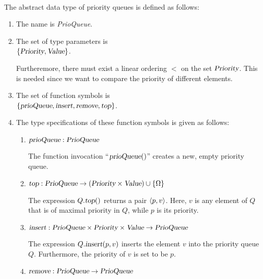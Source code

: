\begin{Definition} \hspace*{\fill} \\
  The abstract data type of priority queues is defined as follows:
  \begin{enumerate}
  \item The name is \textsl{PrioQueue}.
  \item The set of type parameters is \\[0.1cm]
        \hspace*{1.3cm} $\{ \textsl{Priority}, \textsl{Value} \}$.

        Furtheremore, there must exist a linear ordering $<$ on the set $\textsl{Priority}$.
        This is needed since we want to compare the priority of different elements.
  \item The set of function symbols is \\[0.1cm]
       \hspace*{1.3cm} 
       $\{ \textsl{prioQueue}, \textsl{insert}, \textsl{remove}, \textsl{top} \}$.
  \item The type specifications of these function symbols is given as follows:
        \begin{enumerate}
        \item $\textsl{prioQueue}: \textsl{PrioQueue}$

              The function invocation  ``$\textsl{prioQueue}()$'' creates a new, empty priority queue.
        \item $\textsl{top}: \textsl{PrioQueue}  \rightarrow (\textsl{Priority} \times \textsl{Value}) \cup \{\Omega\}$

              The expression $Q.\textsl{top}()$ returns a pair $\pair(p,v)$.  Here,  $v$ is any
              element of $Q$ that is of maximal priority in $Q$, while $p$ is its priority.
        \item $\textsl{insert}: \textsl{PrioQueue} \times \textsl{Priority} \times \textsl{Value} \rightarrow \textsl{PrioQueue}$

              The expression $Q.\textsl{insert}(p,v)$ inserts the  element $v$ into the priority queue $Q$.
              Furthermore, the priority of $v$ is set to be $p$.
        \item $\textsl{remove}: \textsl{PrioQueue} \rightarrow \textsl{PrioQueue}$


\end{enumerate}
\end{enumerate}
\end{Definition}
